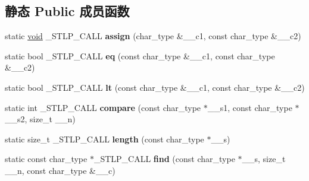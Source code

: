 \subsection*{静态 Public 成员函数}
\begin{DoxyCompactItemize}
\item 
\mbox{\label{class____char__traits__base_a75dd379765c8b92e4c62fbaa1ec623fa}} 
static \hyperlink{interfacevoid}{void} \+\_\+\+S\+T\+L\+P\+\_\+\+C\+A\+LL {\bfseries assign} (char\+\_\+type \&\+\_\+\+\_\+c1, const char\+\_\+type \&\+\_\+\+\_\+c2)
\item 
\mbox{\label{class____char__traits__base_a8155e408bf725678ad7ec0ded2ac0216}} 
static bool \+\_\+\+S\+T\+L\+P\+\_\+\+C\+A\+LL {\bfseries eq} (const char\+\_\+type \&\+\_\+\+\_\+c1, const char\+\_\+type \&\+\_\+\+\_\+c2)
\item 
\mbox{\label{class____char__traits__base_a25220fc1e095af7f251a12318c9b9d0c}} 
static bool \+\_\+\+S\+T\+L\+P\+\_\+\+C\+A\+LL {\bfseries lt} (const char\+\_\+type \&\+\_\+\+\_\+c1, const char\+\_\+type \&\+\_\+\+\_\+c2)
\item 
\mbox{\label{class____char__traits__base_a1c10a6127e3287c7417fe40962b38267}} 
static int \+\_\+\+S\+T\+L\+P\+\_\+\+C\+A\+LL {\bfseries compare} (const char\+\_\+type $\ast$\+\_\+\+\_\+s1, const char\+\_\+type $\ast$\+\_\+\+\_\+s2, size\+\_\+t \+\_\+\+\_\+n)
\item 
\mbox{\label{class____char__traits__base_a59398edb1451058f79b4bc2c045bc688}} 
static size\+\_\+t \+\_\+\+S\+T\+L\+P\+\_\+\+C\+A\+LL {\bfseries length} (const char\+\_\+type $\ast$\+\_\+\+\_\+s)
\item 
\mbox{\label{class____char__traits__base_a7f63f261d0cc1cb54fc0e3a919a21da6}} 
static const char\+\_\+type $\ast$\+\_\+\+S\+T\+L\+P\+\_\+\+C\+A\+LL {\bfseries find} (const char\+\_\+type $\ast$\+\_\+\+\_\+s, size\+\_\+t \+\_\+\+\_\+n, const char\+\_\+type \&\+\_\+\+\_\+c)
\item 
\mbox{\label{class____char__traits__base_adfcfe03ab486fbc945072e4fd7bbb7e5}} 

\end{DoxyCompactItemize}
